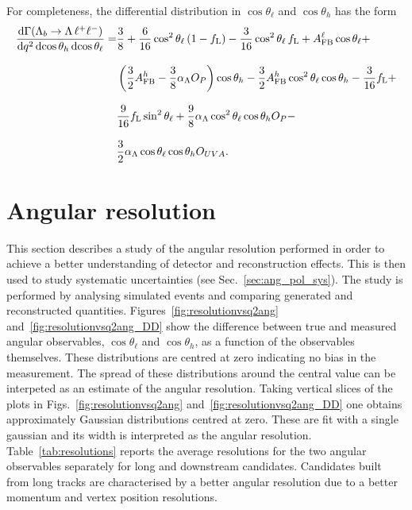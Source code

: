 For completeness, the differential distribution in $\cos\theta_\ell$ and $\cos\theta_h$ has the form
\begin{align}
\frac{\mathrm{d}\Gamma(\Lambda_{b}\rightarrow \Lambda \,\ell^{+}\ell^{-})}{\mathrm{d}q^2\,\mathrm{d}\!\cos\theta_h\, \mathrm{d}\!\cos\theta_\ell}=&
\frac{3}{8}+\frac{6}{16}\cos^2\theta_\ell\,(1-f_{\rm L})-\frac{3}{16}\cos^2\theta_\ell\, f_{\rm L}
+A_{\rm FB}^\ell\cos\theta_\ell+ \nonumber \\[8pt]
& \left(\frac{3}{2}A_{\rm FB}^h-\frac{3}{8}\alpha_\Lambda O_P\right)\cos\theta_h
-\frac{3}{2}A_{\rm FB}^h\cos^2\theta_\ell\cos\theta_h-\frac{3}{16}f_{\rm L}+ \nonumber \\[8pt]
& \frac{9}{16}f_{\rm L}\sin^2\theta_\ell+\frac{9}{8}\alpha_\Lambda \cos^2\theta_\ell\cos\theta_h O_P- \nonumber \\[8pt]
& \frac{3}{2}\alpha_\Lambda \cos\theta_\ell\cos\theta_h O_{UVA}.
\label{eq:2DcosThetaLandB}
\end{align}


\section{Angular resolution}
\label{sec:and_resolution}

This section describes a study of the angular resolution performed in order to achieve a better understanding
of detector and reconstruction effects. This is then used to study systematic uncertainties (see Sec.~\ref{sec:ang_pol_sys}).
The study is performed by analysing simulated events and comparing generated and reconstructed quantities.
Figures~\ref{fig:resolutionvsq2ang} and~\ref{fig:resolutionvsq2ang_DD} show the difference between true and measured 
angular observables, $\cos \theta_\ell$ and $\cos \theta_h$, as a function of the observables themselves.
These distributions are centred at zero indicating no bias in the measurement.
The spread of these distributions around the central value can be interpeted as an estimate of the angular resolution.
Taking vertical slices of the plots in Figs.~\ref{fig:resolutionvsq2ang} and~\ref{fig:resolutionvsq2ang_DD}  one obtains approximately Gaussian
distributions centred at zero. These are fit with a single gaussian and its width
is interpreted as the angular resolution. Table~\ref{tab:resolutions} reports the average resolutions
for the two angular observables separately for long and downstream candidates. Candidates built
from long tracks are characterised by a better angular resolution due to a better momentum and vertex position resolutions.


